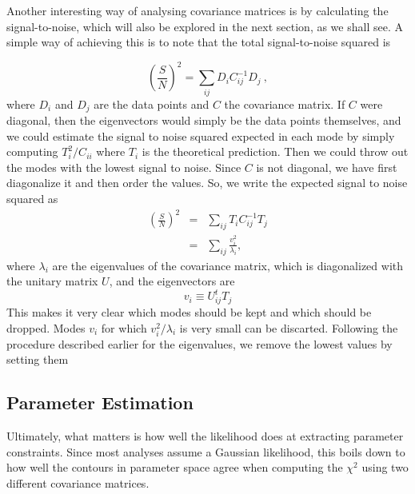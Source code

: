 \documentclass[twocolumn]{\docclass}
\newcommand{\rf}[1]{\ref{fig:#1}}
\newcommand\be{\begin{equation}}
\newcommand\ee{\end{equation}}
\def\bea{\begin{eqnarray}}
\def\eea{\end{eqnarray}}
\begin{document}
Another interesting way of analysing covariance matrices is by calculating the signal-to-noise, which will also be explored in the next section, as we shall see. A simple way of achieving this is to note that the total signal-to-noise squared is

\be
\left(\frac{S}{N}\right)^2 = \sum_{ij} D_i C^{-1}_{ij} D_j\
,\ee
where $D_i$ and $D_j$ are the data points and $C$ the covariance matrix. If $C$ were diagonal, then the eigenvectors would simply be the data points themselves, and we could estimate the signal to noise squared expected in each mode by simply computing $T_i^2/C_{ii}$ where $T_i$ is the theoretical prediction. Then we could throw out the modes with the lowest signal to noise. Since $C$ is not diagonal, we have first diagonalize it and then order the values. So, we write the expected signal to noise squared as
\bea
\left(\frac{S}{N}\right)^2 &=& \sum_{ij} T_i  C^{-1}_{ij} T_j\nonumber\\
&=& \sum_{ij} \frac{v_i^2}{\lambda_i}
,\eea
where $\lambda_i$ are the eigenvalues of the covariance matrix, which is diagonalized with the unitary matrix $U$, and the eigenvectors are 
\be
v_i\equiv U_{ij}^t T_j
\ee
This makes it very clear which modes should be kept and which should be dropped. Modes $v_i$ for which $v_i^2/\lambda_i$ is very small can be discarted. Following the procedure described earlier for the eigenvalues, we remove the lowest values by setting them 

\subsection{Parameter Estimation}

Ultimately, what matters is how well the likelihood does at extracting parameter constraints. Since most analyses assume a Gaussian likelihood, this boils down to how well the contours in parameter space agree when computing the $\chi^2$ using two different covariance matrices.
\end{document}
